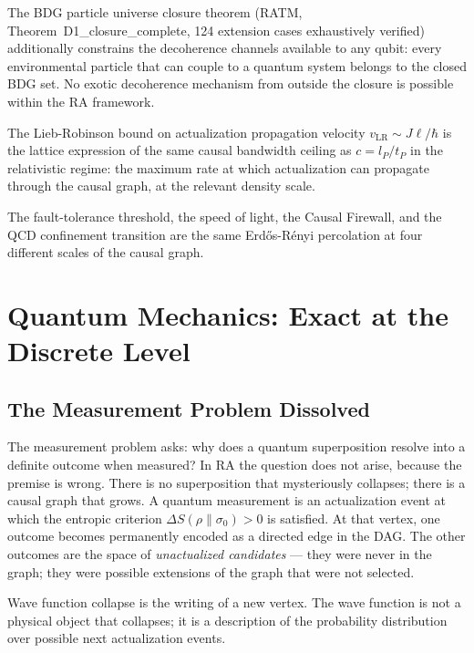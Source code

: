 \documentclass[11pt,a4paper]{article}
\begin{document}
The BDG particle universe closure theorem (RATM, Theorem~D1\_closure\_complete,
124 extension cases exhaustively verified) additionally constrains the
decoherence channels available to any qubit: every environmental particle
that can couple to a quantum system belongs to the closed BDG set.
No exotic decoherence mechanism from outside the closure is possible
within the RA framework.

The Lieb-Robinson bound on actualization propagation velocity
$v_{\mathrm{LR}} \sim J\ell/\hbar$ is the lattice expression of the
same causal bandwidth ceiling as $c = l_P/t_P$ in the relativistic
regime: the maximum rate at which actualization can propagate through
the causal graph, at the relevant density scale.

The fault-tolerance threshold, the speed of light, the Causal Firewall,
and the QCD confinement transition are the same Erd\H{o}s-R\'{e}nyi
percolation at four different scales of the causal graph.

\section{Quantum Mechanics: Exact at the Discrete Level}
\label{sec:QM}

\subsection{The Measurement Problem Dissolved}

The measurement problem asks: why does a quantum superposition resolve
into a definite outcome when measured? In RA the question does not arise,
because the premise is wrong. There is no superposition that mysteriously
collapses; there is a causal graph that grows. A quantum measurement is an
actualization event at which the entropic criterion $\Delta S(\rho\|\sigma_0)
> 0$ is satisfied. At that vertex, one outcome becomes permanently encoded
as a directed edge in the DAG. The other outcomes are the space of
\emph{unactualized candidates} --- they were never in the graph; they were
possible extensions of the graph that were not selected.

Wave function collapse is the writing of a new vertex. The wave function
is not a physical object that collapses; it is a description of the
probability distribution over possible next actualization events.
\end{document}
